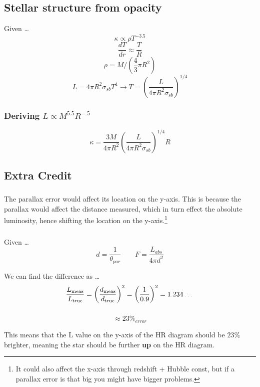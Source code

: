 \documentclass{article}
\begin{document}
\subsection{Stellar structure from opacity}
Given \dots
\[\kappa \propto \rho T^{-3.5}\]
\[\frac{dT}{dr} \approx \frac{T}{R}\]
\[\rho = M / (\frac{4}{3}\pi R^2)\]
\[L=4\pi R^2 \sigma_{sb} T^4 \rightarrow T = \left( \frac{L}{4 \pi R^2 \sigma_{sb}} \right)^{1/4}\]

\subsubsection{Deriving \(L \propto M^{5.5} R^{-.5} \)}
\[\kappa = \frac{3M}{4\pi R^2}  \left(\frac{L}{4\pi R^2\sigma_{sb}}\right)^{1/4}R\]
\subsection{Extra Credit}
\subsubsection{}
The parallax error would affect its location on the y-axis. This is because the parallax would affect the distance measured, which in turn effect the absolute luminosity, hence shifting the location on the y-axis.\footnote{It could also affect the x-axis through redshift + Hubble const, but if a parallax error is that big you might have bigger problems.}

\subsubsection{}
Given \dots
\[d = \frac{1}{\theta_{par}} \qquad F = \frac{L_{abs}}{4\pi d^2} \]

We can find the difference as \dots
\[
\frac{L_{\rm meas}}{L_{\rm true}}
= \left(\frac{d_{\rm meas}}{d_{\rm true}}\right)^2
= \left(\frac{1}{0.9}\right)^2
= 1.234\dots
\]

\subsubsection{}
\[\approx 23\%_{error}\]

\begin{center}
    This means that the L value on the y-axis of the HR diagram should be \(23\%\) brighter, meaning the star should be further \textbf{up} on the HR diagram.
\end{center}

\end{document}
